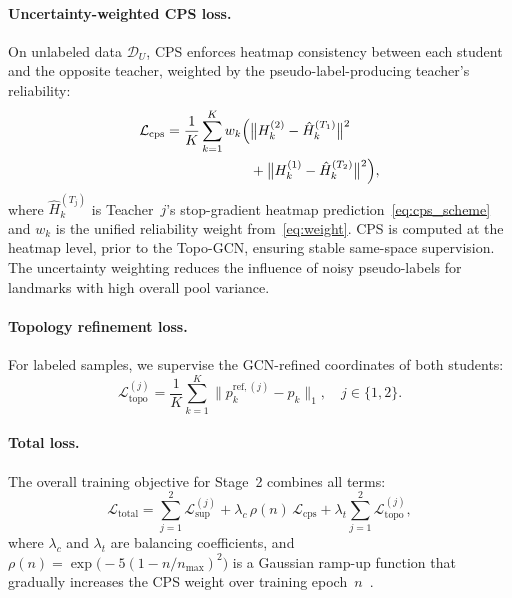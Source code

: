 \documentclass[conference]{IEEEtran}
\begin{document}
\paragraph{Uncertainty-weighted CPS loss.}
On unlabeled data $\mathcal{D}_U$, CPS enforces heatmap consistency between each student and the opposite teacher, weighted by the pseudo-label-producing teacher's reliability:
\begin{align}
  \mathcal{L}_{\mathrm{cps}} = \frac{1}{K}\sum_{k=1}^{K} w_k \Bigl(&
    \bigl\|H_k^{(2)} - \hat{H}_k^{(T_1)}\bigr\|^2 \notag\\
    &+ \bigl\|H_k^{(1)} - \hat{H}_k^{(T_2)}\bigr\|^2
  \Bigr),
  \label{eq:loss_cps}
\end{align}
where $\hat{H}_k^{(T_j)}$ is Teacher~$j$'s stop-gradient heatmap prediction~\eqref{eq:cps_scheme} and $w_k$ is the unified reliability weight from~\eqref{eq:weight}. CPS is computed at the heatmap level, prior to the Topo-GCN, ensuring stable same-space supervision. The uncertainty weighting reduces the influence of noisy pseudo-labels for landmarks with high overall pool variance.

\paragraph{Topology refinement loss.}
For labeled samples, we supervise the GCN-refined coordinates of both students:
\begin{equation}
  \mathcal{L}_{\mathrm{topo}}^{(j)} = \frac{1}{K}\sum_{k=1}^{K}
    \bigl\|p_k^{\mathrm{ref},(j)} - p_k\bigr\|_1, \quad j \in \{1,2\}.
  \label{eq:loss_topo}
\end{equation}

\paragraph{Total loss.}
The overall training objective for Stage~2 combines all terms:
\begin{equation}
  \mathcal{L}_{\mathrm{total}} = \sum_{j=1}^{2}\mathcal{L}_{\mathrm{sup}}^{(j)}
    + \lambda_c\,\rho(n)\,\mathcal{L}_{\mathrm{cps}}
    + \lambda_t\sum_{j=1}^{2}\mathcal{L}_{\mathrm{topo}}^{(j)},
  \label{eq:loss_total}
\end{equation}
where $\lambda_c$ and $\lambda_t$ are balancing coefficients, and $\rho(n) = \exp\!\bigl(-5(1 - n/n_{\max})^2\bigr)$ is a Gaussian ramp-up function that gradually increases the CPS weight over training epoch~$n$~\cite{Tarvainen2017_mean_teacher}.
\end{document}
